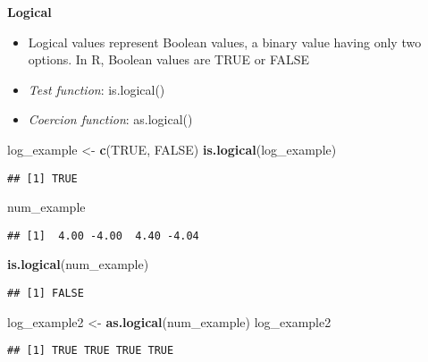 \documentclass[]{article}
\newenvironment{Shaded}{\begin{snugshade}}{\end{snugshade}}
\newcommand{\KeywordTok}[1]{\textcolor[rgb]{0.13,0.29,0.53}{\textbf{#1}}}
\newcommand{\StringTok}[1]{\textcolor[rgb]{0.31,0.60,0.02}{#1}}
\newcommand{\OtherTok}[1]{\textcolor[rgb]{0.56,0.35,0.01}{#1}}
\newcommand{\NormalTok}[1]{#1}
\providecommand{\tightlist}{%
  \setlength{\itemsep}{0pt}\setlength{\parskip}{0pt}}
\begin{document}
\textbf{Logical}

\begin{itemize}
\tightlist
\item
  Logical values represent Boolean values, a binary value having only
  two options. In R, Boolean values are TRUE or FALSE
\item
  \emph{Test function}: is.logical()
\item
  \emph{Coercion function}: as.logical()
\end{itemize}

\begin{Shaded}
\begin{Highlighting}[]
\NormalTok{log_example <-}\StringTok{ }\KeywordTok{c}\NormalTok{(}\OtherTok{TRUE}\NormalTok{, }\OtherTok{FALSE}\NormalTok{)}
\KeywordTok{is.logical}\NormalTok{(log_example)}
\end{Highlighting}
\end{Shaded}

\begin{verbatim}
## [1] TRUE
\end{verbatim}

\begin{Shaded}
\begin{Highlighting}[]
\NormalTok{num_example}
\end{Highlighting}
\end{Shaded}

\begin{verbatim}
## [1]  4.00 -4.00  4.40 -4.04
\end{verbatim}

\begin{Shaded}
\begin{Highlighting}[]
\KeywordTok{is.logical}\NormalTok{(num_example)}
\end{Highlighting}
\end{Shaded}

\begin{verbatim}
## [1] FALSE
\end{verbatim}

\begin{Shaded}
\begin{Highlighting}[]
\NormalTok{log_example2 <-}\StringTok{ }\KeywordTok{as.logical}\NormalTok{(num_example)}
\NormalTok{log_example2}
\end{Highlighting}
\end{Shaded}

\begin{verbatim}
## [1] TRUE TRUE TRUE TRUE
\end{verbatim}
\end{document}
